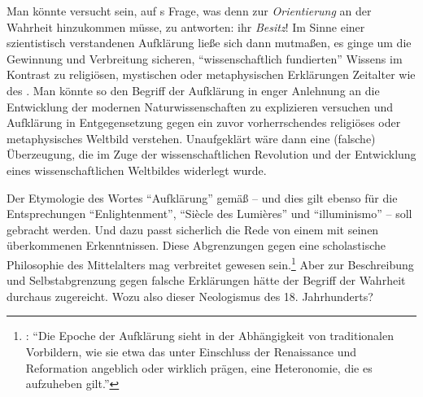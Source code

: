 Man könnte versucht sein, auf
s
Frage, was denn zur \emph{Orientierung} an der Wahrheit hinzukommen müsse, zu
antworten: ihr \emph{Besitz}! Im Sinne einer szientistisch verstandenen
Aufklärung ließe sich dann mutmaßen, es ginge um die Gewinnung und Verbreitung
sicheren, \enquote{wissenschaftlich fundierten} Wissens im Kontrast zu religiösen,
mystischen oder metaphysischen Erklärungen  Zeitalter
wie des . Man
könnte so den Begriff der Aufklärung in enger Anlehnung an die Entwicklung der
modernen Naturwissenschaften zu explizieren versuchen und Aufklärung in
Entgegensetzung gegen ein zuvor vorherrschendes religiöses oder metaphysisches
Weltbild verstehen. Unaufgeklärt wäre dann eine (falsche) Überzeugung, die im
Zuge der wissenschaftlichen Revolution und der Entwicklung eines
wissenschaftlichen Weltbildes widerlegt wurde.

Der Etymologie des Wortes \enquote{Aufklärung} gemäß -- und dies gilt ebenso für
die Entsprechungen \enquote{Enlightenment}, \enquote{Si{\`e}cle des
Lumi{\`e}res} und \enquote{illuminismo} -- soll 
gebracht werden. Und dazu passt sicherlich die Rede von einem  mit seinen überkommenen Erkenntnissen. Diese Abgrenzungen gegen
eine scholastische Philosophie des Mittelalters mag verbreitet gewesen
sein.\footnote{\cite[Vgl.][42]{Stekeler-Weithofer:Denken2012}:
\enquote{Die Epoche der Aufklärung sieht in der Abhängigkeit von traditionalen
Vorbildern, wie sie etwa das  unter Einschluss der
Renaissance und Reformation angeblich oder wirklich prägen, eine Heteronomie,
die es aufzuheben gilt.}} Aber zur Beschreibung und Selbstabgrenzung gegen
falsche Erklärungen hätte der Begriff der Wahrheit durchaus zugereicht. Wozu
also dieser Neologismus des {18.} Jahrhunderts?

